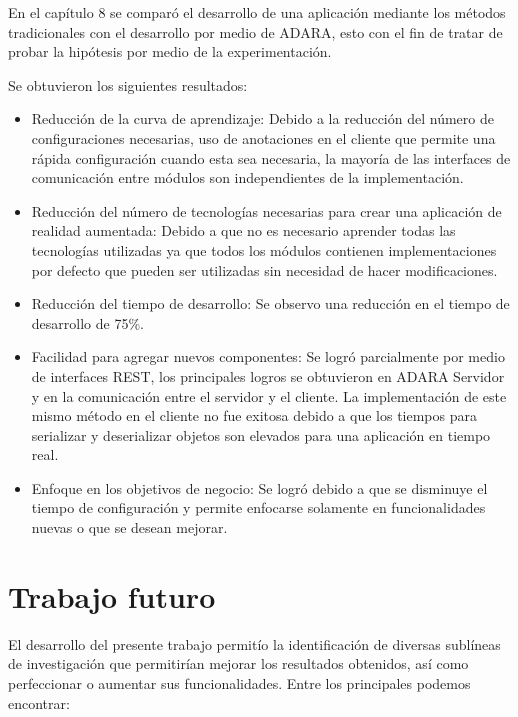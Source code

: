 \documentclass[12pt,a4paper,spanish,openany]{book}
\begin{document}
En el capítulo 8 se comparó el desarrollo de una aplicación mediante los métodos
tradicionales con el desarrollo por medio de  ADARA, esto con el fin de tratar
de probar la hipótesis por medio de la experimentación.

Se obtuvieron los siguientes resultados:

\begin{itemize}
  \item Reducción de la curva de aprendizaje: Debido a la reducción del número
  de configuraciones necesarias, uso de anotaciones en el cliente que permite
 una rápida configuración cuando esta sea necesaria, la mayoría de las
 interfaces de comunicación entre módulos son independientes de la
 implementación.
 \item Reducción del número de tecnologías necesarias para crear una aplicación
 de realidad aumentada: Debido a que no es necesario aprender todas las
 tecnologías utilizadas ya que todos los módulos contienen
 implementaciones por defecto que pueden ser utilizadas sin necesidad de hacer
 modificaciones.
 \item Reducción del tiempo de desarrollo: Se observo una reducción en el tiempo
 de desarrollo de 75\%.
 \item Facilidad para agregar nuevos componentes: Se logró parcialmente por
 medio de interfaces REST, los principales  logros se obtuvieron en ADARA
 Servidor y en la comunicación entre el servidor y el cliente. La implementación
 de este mismo método en el cliente no fue exitosa debido a que los tiempos para
 serializar y deserializar objetos son elevados para una aplicación en tiempo
 real.
 \item Enfoque en los objetivos de negocio: Se logró debido a que se disminuye
 el tiempo de configuración y permite enfocarse solamente en funcionalidades
 nuevas o que se desean mejorar.

\end{itemize}


\chapter{Trabajo futuro}

El desarrollo del presente trabajo permitío la identificación de diversas
sublíneas de investigación que permitirían mejorar los resultados obtenidos, así
como perfeccionar o aumentar sus funcionalidades. Entre los principales podemos
encontrar:
\end{document}
